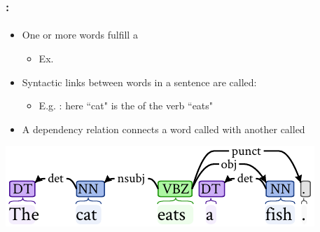 \documentclass[xcolor=table]{beamer}
\begin{document}
\begin{frame}
	\frametitle{\insertshortsubtitle: \insertsection}
	\framesubtitle{\insertsubsection}

	\begin{itemize}
		\item One or more words fulfill a 
		\begin{itemize}
			\item Ex. 
		\end{itemize}
		\item Syntactic links between words in a sentence are called: 
		\begin{itemize}
			\item E.g. : here ``cat" is the  of the verb ``eats"
		\end{itemize}
		\item A dependency relation connects a word called  with another called 
	\end{itemize}
	
	\includegraphics[width=\textwidth]{../img/intro/dep_gram_.pdf}

\end{frame}
\end{document}
